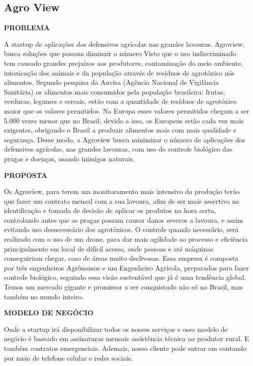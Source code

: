 \subsection{Agro View}

\textbf{PROBLEMA}

A startup de aplicações dos defensivos agrícolas nas grandes lavouras. Agroview, busca soluções que possam diminuir o número 
Visto que o uso indiscriminado   tem causado grandes prejuízos aos produtores, contaminação do meio ambiente, intoxicação dos animais e da população através de resíduos de agrotóxico nós alimentos. Segundo pesquisa da Anvisa (Agência Nacional de Vigilância Sanitária) os alimentos mais consumidos pela população brasileira: frutas, verduras, legumes e cereais, estão com a quantidade de resíduos de agrotóxico maior que os valores permitidos. Na Europa esses valores permitidos chegam a ser 5.000 vezes menor que no Brasil, devido a isso, os Europeus 
estão cada vez mais exigentes, obrigando o Brasil a produzir alimentos mais com mais qualidade e segurança. Desse modo, a Agroview busca minimizar o número de aplicações dos defensivos agrícolas, nas grandes lavouras, com uso do controle biológico das pragas e doenças, usando inimigos naturais.

\textbf{PROPOSTA}

Os Agroview, para terem um monitoramento mais intensivo da  produção terão que fazer um contrato mensal com a 
sua lavoura, afim de ser mais assertivo na identificação e tomada de decisão de aplicar os produtos  na hora certa, controlando antes que as pragas possam causar danos severos a lavoura, e assim  evitando uso desnecessário dos agrotóxicos. O controle quando necessário, será realizado com o uso de um drone, para dar mais agilidade ao processo e eficiência principalmente em local de difícil acesso, onde pessoas e até máquinas conseguiriam chegar, caso  de áreas muito declivosas. Essa empresa é composta por três engenheiros Agrônomos e um Engenheiro Agrícola, preparados para fazer controle biológico, seguindo  essa  visão sustentável que  já é uma tendência global. Temos um mercado gigante e promissor a ser  conquistado não só no Brasil, mas também no mundo inteiro.

\textbf{MODELO DE NEGÓCIO}

Onde a startup irá disponibilizar todos os nossos serviços e  osso modelo de negócio é baseado em assinaturas mensais assistência técnica ao produtor rural. E também contratos emergenciais. Ademais, nosso cliente pode entrar em contando por meio de telefone celular e redes sociais.


